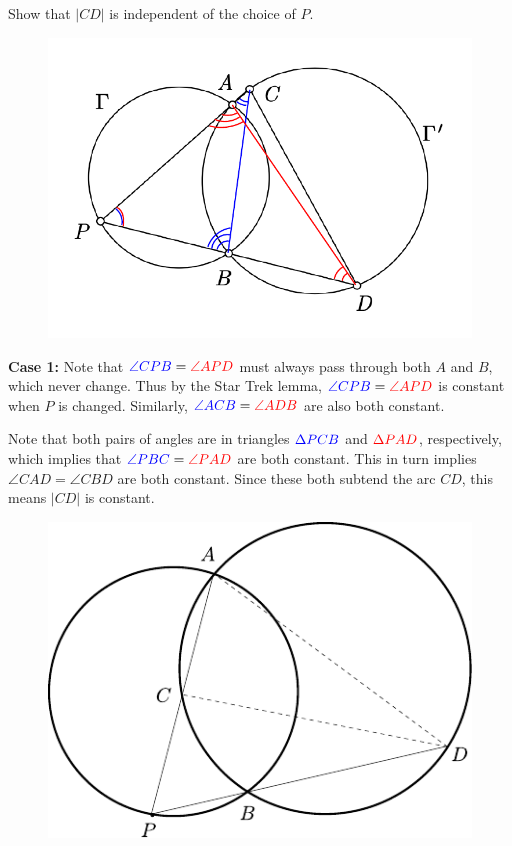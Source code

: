 \documentclass[twoside,10pt]{article}
\begin{document}
\newpage

\begin{exer}[1.49]
Show that $|CD|$ is independent of the choice of $P$.
\end{exer}

\begin{figure}[H]
	\centering
	\includegraphics[scale=0.6]{fig/49.pdf}
\end{figure}

\textbf{Case 1:} Note that ${\color{blue}\angle CPB} = {\color{red}\angle APD}$ must always pass through both $A$ and $B$, which never change. Thus by the Star Trek lemma, ${\color{blue}\angle CPB}={\color{red}\angle APD}$ is constant when $P$ is changed. Similarly, ${\color{blue}\angle ACB} = {\color{red}\angle ADB}$ are also both constant.

Note that both pairs of angles are in triangles ${\color{blue}\Delta PCB}$ and ${\color{red}\Delta PAD}$, respectively, which implies that ${\color{blue}\angle PBC} = {\color{red}\angle PAD}$ are both constant. This in turn implies $\angle CAD = \angle CBD$ are both constant. Since these both subtend the arc $CD$, this means $|CD|$ is constant.

\begin{figure}[H]
	\centering
	\includegraphics[scale=0.8]{fig/49-2.pdf}
\end{figure}
\end{document}
